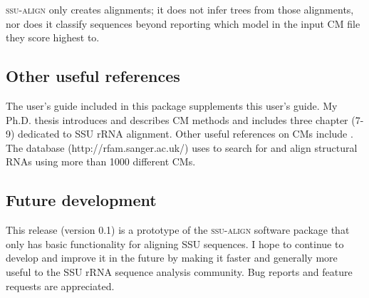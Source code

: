 \textsc{ssu-align} only creates alignments; it does not infer trees
from those alignments, nor does it classify sequences beyond reporting
which model in the input CM file they score highest to.

\subsection{Other useful references}

The  user's guide \cite{infernalguide} included in
this package supplements this user's guide. My Ph.D. thesis introduces
and describes CM methods and includes three chapter (7-9) dedicated to
SSU rRNA alignment. Other useful references on CMs include
\cite{Eddy94,Eddy02b,NawrockiEddy07,Nawrocki09,KolbeEddy09}.  The
 database (http://rfam.sanger.ac.uk/) \cite{Gardner09}
uses  to search for and align structural RNAs using
more than 1000 different CMs.

\subsection{Future development}

This release (version 0.1) is a prototype of the \textsc{ssu-align}
software package that only has basic functionality for aligning SSU
sequences. I hope to continue to develop and improve it in the future
by making it faster and generally more useful to the SSU rRNA sequence
analysis community. Bug reports and feature requests are appreciated.

